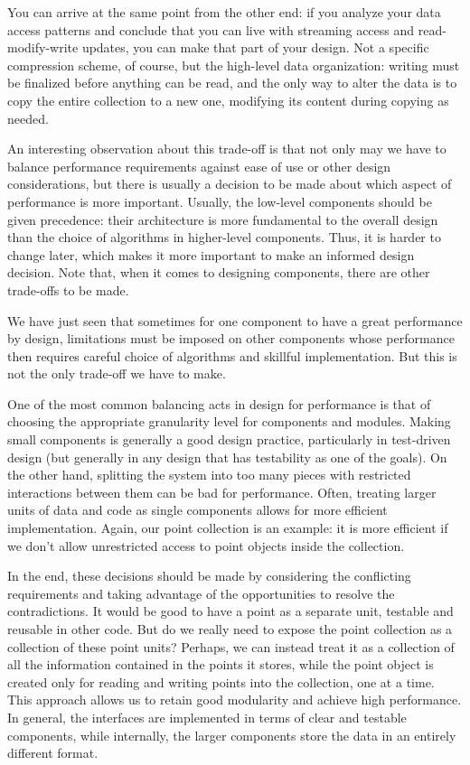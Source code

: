 You can arrive at the same point from the other end: if you analyze your data access patterns and conclude that you can live with streaming access and read-modify-write updates, you can make that part of your design. Not a specific compression scheme, of course, but the high-level data organization: writing must be finalized before anything can be read, and the only way to alter the data is to copy the entire collection to a new one, modifying its content during copying as needed. 

An interesting observation about this trade-off is that not only may we have to balance performance requirements against ease of use or other design considerations, but there is usually a decision to be made about which aspect of performance is more important. Usually, the low-level components should be given precedence: their architecture is more fundamental to the overall design than the choice of algorithms in higher-level components. Thus, it is harder to change later, which makes it more important to make an informed design decision. Note that, when it comes to designing components, there are other trade-offs to be made. 


We have just seen that sometimes for one component to have a great performance by design, limitations must be imposed on other components whose performance then requires careful choice of algorithms and skillful implementation. But this is not the only trade-off we have to make. 

One of the most common balancing acts in design for performance is that of choosing the appropriate granularity level for components and modules. Making small components is generally a good design practice, particularly in test-driven design (but generally in any design that has testability as one of the goals). On the other hand, splitting the system into too many pieces with restricted interactions between them can be bad for performance. Often, treating larger units of data and code as single components allows for more efficient implementation. Again, our point collection is an example: it is more efficient if we don't allow unrestricted access to point objects inside the collection. 

In the end, these decisions should be made by considering the conflicting requirements and taking advantage of the opportunities to resolve the contradictions. It would be good to have a point as a separate unit, testable and reusable in other code. But do we really need to expose the point collection as a collection of these point units? Perhaps, we can instead treat it as a collection of all the information contained in the points it stores, while the point object is created only for reading and writing points into the collection, one at a time. This approach allows us to retain good modularity and achieve high performance. In general, the interfaces are implemented in terms of clear and testable components, while internally, the larger components store the data in an entirely different format. 

